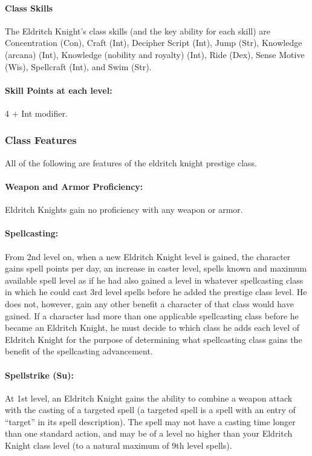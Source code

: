 \paragraph{Class Skills}
The Eldritch Knight's class skills (and the key ability for each skill) are Concentration (Con), Craft (Int), Decipher Script (Int), Jump (Str), Knowledge (arcana) (Int), Knowledge (nobility and royalty) (Int), Ride (Dex), Sense Motive (Wis), Spellcraft (Int), and Swim (Str).
\paragraph{Skill Points at each level:} 4 + Int modifier.

\subsubsection{Class Features}
All of the following are features of the eldritch knight prestige class.

\paragraph{Weapon and Armor Proficiency:} Eldritch Knights gain no proficiency with any weapon or armor.

\paragraph{Spellcasting:} From 2nd level on, when a new Eldritch Knight level is gained, the character gains spell points per day, an increase in caster level, spells known and maximum available spell level as if he had also gained a level in whatever spellcasting class in which he could cast 3rd level spells before he added the prestige class level.
He does not, however, gain any other benefit a character of that class would have gained. 
If a character had more than one applicable spellcasting class before he became an Eldritch Knight, he must decide to which class he adds each level of Eldritch Knight for the purpose of determining what spellcasting class gains the benefit of the spellcasting advancement.

\paragraph{Spellstrike (Su):}
At 1st level, an Eldritch Knight gains the ability to combine a weapon attack with the casting of a targeted spell (a targeted spell is a spell with an entry of ``target'' in its spell description).
The spell may not have a casting time longer than one standard action, and may be of a level no higher than your Eldritch Knight class level (to a natural maximum of 9th level spells).

